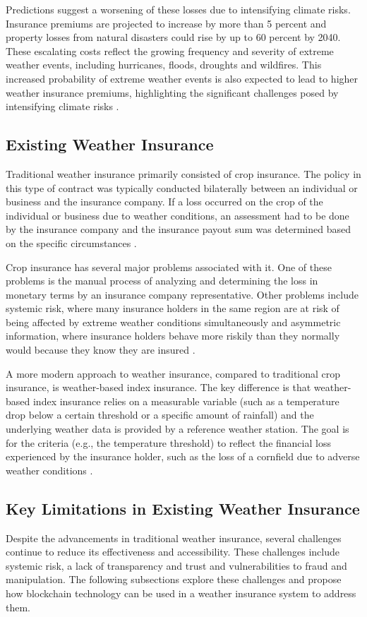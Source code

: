 Predictions suggest a worsening of these losses due to intensifying climate risks. Insurance premiums are projected to increase by more than 5 percent and property losses from natural disasters could rise by up to 60 percent by 2040. These escalating costs reflect the growing frequency and severity of extreme weather events, including hurricanes, floods, droughts and wildfires. This increased probability of extreme weather events is also expected to lead to higher weather insurance premiums, highlighting the significant challenges posed by intensifying climate risks \autocites{cho2022climate}{tucker1997climate}.

\subsection{Existing Weather Insurance}
Traditional weather insurance primarily consisted of crop insurance. The policy in this type of contract was typically conducted bilaterally between an individual or business and the insurance company. If a loss occurred on the crop of the individual or business due to weather conditions, an assessment had to be done by the insurance company and the insurance payout sum was determined based on the specific circumstances \autocite{michler2022risk}.

Crop insurance has several major problems associated with it. One of these problems is the manual process of analyzing and determining the loss in monetary terms by an insurance company representative. Other problems include systemic risk, where many insurance holders in the same region are at risk of being affected by extreme weather conditions simultaneously and asymmetric information, where insurance holders behave more riskily than they normally would because they know they are insured \autocite{makki2002crop}.

\sloppy A more modern approach to weather insurance, compared to traditional crop insurance, is weather-based index insurance. The key difference is that weather-based index insurance relies on a measurable variable (such as a temperature drop below a certain threshold or a specific amount of rainfall) and the underlying weather data is provided by a reference weather station. The goal is for the criteria (e.g., the temperature threshold) to reflect the financial loss experienced by the insurance holder, such as the loss of a cornfield due to adverse weather conditions \autocite{kajwang2022weather}.

\subsection{Key Limitations in Existing Weather Insurance}\label{section:key_limitations_existing_insurance}
Despite the advancements in traditional weather insurance, several challenges continue to reduce its effectiveness and accessibility. These challenges include systemic risk, a lack of transparency and trust and vulnerabilities to fraud and manipulation. The following subsections explore these challenges and propose how blockchain technology can be used in a weather insurance system to address them.


